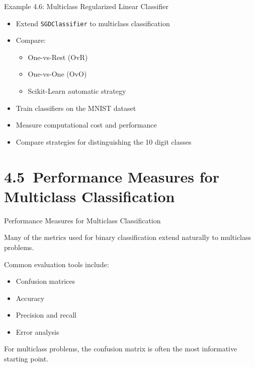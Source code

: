 \documentclass[aspectratio=169]{beamer}
\begin{document}

\begin{frame}{Example 4.6: Multiclass Regularized Linear Classifier}
	
	\begin{itemize}
		\item Extend \texttt{SGDClassifier} to multiclass classification
		\item Compare:
		\begin{itemize}
			\item One-vs-Rest (OvR)
			\item One-vs-One (OvO)
			\item Scikit-Learn automatic strategy
		\end{itemize}
		
		\vspace{0.5em}
		
		\item Train classifiers on the MNIST dataset
		\item Measure computational cost and performance
		\item Compare strategies for distinguishing the 10 digit classes
	\end{itemize}
	
\end{frame}


\section{4.5~Performance Measures for Multiclass Classification}

\begin{frame}{Performance Measures for Multiclass Classification}
	
	Many of the metrics used for binary classification extend naturally to multiclass problems.
	
	\vspace{0.5em}
	
	Common evaluation tools include:
	
	\begin{itemize}
		\item Confusion matrices
		\item Accuracy
		\item Precision and recall
		\item Error analysis
	\end{itemize}
	
	\vspace{0.5em}
	
	For multiclass problems, the confusion matrix is often the most informative starting point.
	
\end{frame}
\end{document}
